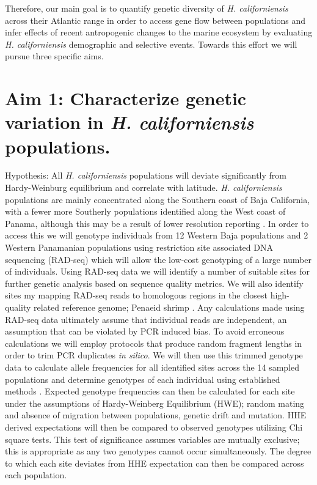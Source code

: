 \documentclass[11pt]{article}
\begin{document}
Therefore, our main goal is to quantify genetic diversity of \emph{H. californiensis} across their Atlantic range in order to access gene flow between populations and infer effects of recent antropogenic changes to the marine ecosystem by evaluating \emph{H. californiensis} demographic and selective events. Towards this effort we will pursue three specific aims.


\section*{Aim 1: Characterize genetic variation in \emph{H. californiensis} populations.}

Hypothesis: All \emph{H. californiensis} populations will deviate significantly from Hardy-Weinburg equilibrium and correlate with latitude. \emph{H. californiensis} populations are mainly concentrated along the Southern coast of Baja California, with a fewer more Southerly populations identified along the West coast of Panama, although this may be a result of lower resolution reporting \cite{Basch1993BiogeographyOH}. In order to access this we will genotype individuals from 12 Western Baja populations and 2 Western Panamanian populations using restriction site associated DNA sequencing (RAD-seq) \cite{rad2011} which will allow the low-cost genotyping of a large number of individuals. Using RAD-seq data we will identify a number of suitable sites for further genetic analysis based on 
sequence quality metrics. We will also identify sites my mapping RAD-seq reads to homologous regions in the closest high-quality related reference genome; Penaeid shrimp \cite{Zhang2019}. Any calculations made using RAD-seq data ultimately assume that individual reads are independent, an assumption that can be violated by PCR induced bias. To avoid erroneous calculations we will employ protocols that produce random fragment lengths in order to trim PCR duplicates \emph{in silico}. We will then use this trimmed genotype data to calculate allele frequencies for all identified sites across the 14 sampled populations and determine genotypes of each individual using established methods \cite{Rochette2017}. Expected genotype frequencies can then be calculated for each site under the assumptions of Hardy-Weinberg Equilibrium (HWE); random mating and absence of migration between populations, genetic drift and mutation. HHE derived expectations will then be compared to observed genotypes utilizing Chi square tests. This test of significance assumes variables are mutually exclusive; this is appropriate as any two genotypes cannot occur simultaneously. The degree to which each site deviates from HHE expectation can then be compared across each population. 
\end{document}
